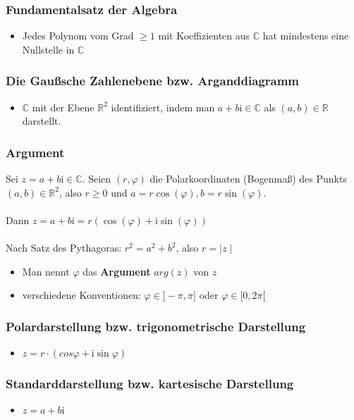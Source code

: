 \documentclass[titlepage]{article}
\newcommand{\C}{\mathbb{C}}
\newcommand{\R}{\mathbb{R}}
\newcommand{\1}{\mathbb{1}}
\newcommand{\0}{\mathbb{0}}
\begin{document}
				\subsubsection{Fundamentalsatz der Algebra}
				\begin{itemize}
					\item Jedes Polynom vom Grad $\ge1$ mit Koeffizienten aus $\C$ hat mindestens eine Nullstelle in $\C$
				\end{itemize}
				\subsubsection{Die Gaußsche Zahlenebene bzw. Arganddiagramm}
					\begin{itemize}
						\item $\C$ mit der Ebene $\R^2$ identifiziert, indem man $a+b\mathrm{i}\in\C$ als $(a,b)\in\R$ darstellt. 
					\end{itemize}
				\subsubsection{Argument}
					Sei $z=a+b\mathrm{i}\in\C$. Seien $(r,\varphi)$ die Polarkoordinaten (Bogenmaß) des Punkts $(a,b)\in\R^2$, also $r\ge0$ und $a=r\cos(\varphi),b=r\sin(\varphi)$. \\\\Dann $z=a+b\mathrm{i}=r(\cos(\varphi)+\mathrm{i}\sin(\varphi))$\\
					\\Nach Satz des Pythagoras: $r^2=a^2+b^2$, also $r=\mid z\mid$
					\begin{itemize}
						\item Man nennt $\varphi$ das \textbf{Argument} $arg(z)$ von $z$
						\item verschiedene Konventionen: $\varphi\in]-\pi,\pi]$ oder $\varphi\in[0,2\pi[$
					\end{itemize}
				\subsubsection{Polardarstellung bzw. trigonometrische Darstellung}
					\begin{itemize}
						\item $z=r\cdot(cos\varphi+\mathrm{i}\sin\varphi)$
					\end{itemize}
				\subsubsection{Standarddarstellung bzw. kartesische Darstellung}
					\begin{itemize}
						\item $z=a+b\mathrm{i}$
					\end{itemize}
\end{document}
